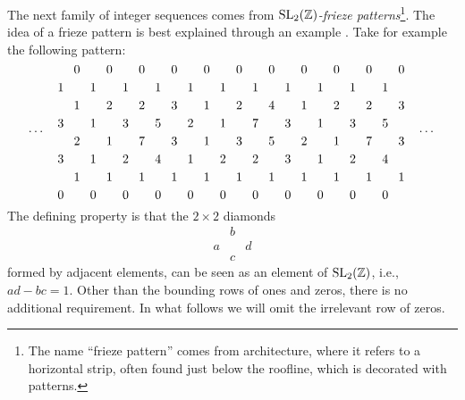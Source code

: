 \begin{example}\label{exmp:frieze_patterns}

	The next family of integer sequences comes from \emph{$\operatorname{SL}_2(\mathbb{Z})$-frieze
		patterns}\footnote{The name ``frieze pattern'' comes from architecture, where it refers
		to a horizontal strip, often found just below the roofline, which is decorated with
		patterns.}. The idea of a frieze
	pattern is best explained through an example \parencite{Coxeter1971FriezePatterns}. Take for example the following pattern:
	\begin{equation*}
		\dots\quad
		\begin{tikzcd}[
				sep = 0.2em, cramped,
			]
			&0&&0&&0&&0&&0&&0&&0&&0&&0&&0&&0\\
			1&&1&&1&&1&&1&&1&&1&&1&&1&&1&&1\\
			&1&&2&&2&&3&&1&&2&&4&&1&&2&&2&&3\\
			3&&1&&3&&5&&2&&1&&7&&3&&1&&3&&5\\
			&2&&1&&7&&3&&1&&3&&5&&2&&1&&7&&3\\
			3&&1&&2&&4&&1&&2&&2&&3&&1&&2&&4\\
			&1&&1&&1&&1&&1&&1&&1&&1&&1&&1&&1\\
			0&&0&&0&&0&&0&&0&&0&&0&&0&&0&&0
		\end{tikzcd}
		\quad
		\dots
	\end{equation*}
	The defining property is that the $2 \times 2$ diamonds
	\begin{equation*}
		\begin{matrix}
			  & b &   \\
			a &   & d \\
			  & c &
		\end{matrix}
	\end{equation*}
	formed by adjacent elements, can be seen as an element of $\operatorname{SL}_2 (\mathbb{Z})$, i.e., $ad - bc = 1$. Other than the bounding rows of ones and zeros, there is no additional requirement. In what follows we will omit the irrelevant row of zeros.


\end{example}
